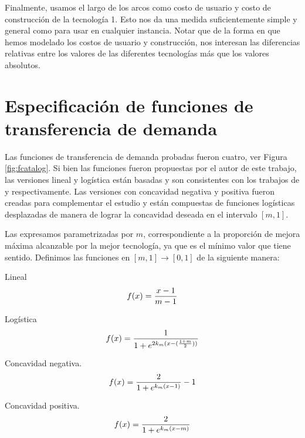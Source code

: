 Finalmente, usamos el largo de los arcos como costo de usuario y costo de construcción de la tecnología 1. Esto nos da una medida suficientemente simple y general como para usar en cualquier instancia. Notar que de la forma en que hemos modelado los costos de usuario y construcción, nos interesan las diferencias relativas entre los valores de las diferentes tecnologías más que los valores absolutos.

\section{Especificación de funciones de transferencia de demanda}
\label{sect:fspecification}

Las funciones de transferencia de demanda probadas fueron cuatro, ver Figura \ref{fig:fcatalog}. Si bien las funciones fueron propuestas por el autor de este trabajo, las versiones lineal y logística están basadas y son consistentes con los trabajos de \textcite{shwe2014} y \textcite{ortuz2011} respectivamente. Las versiones con concavidad negativa y positiva fueron creadas para complementar el estudio y están compuestas de funciones logísticas desplazadas de manera de lograr la concavidad deseada en el intervalo $[m, 1]$.

Las expresamos parametrizadas por $m$, correspondiente a la proporción de mejora máxima alcanzable por la mejor tecnología, ya que es el mínimo valor que tiene sentido. Definimos las funciones en $[m, 1] \rightarrow [0, 1]$ de la siguiente manera:

\begin{definition}
  Lineal
  \begin{align}
      f(x) = {x -1 \over m - 1}
  \end{align}
\end{definition}

\begin{definition}
  Logística
  \begin{align}
      f(x) = {1 \over 1 + e^{2k_m(x - ({1 + m \over 2}))}}
  \end{align}
\end{definition}

\begin{definition}
  Concavidad negativa.
  \begin{align}
      f(x) = {2 \over 1 + e^{k_m(x - 1)}} - 1
  \end{align}
\end{definition}

\begin{definition}
  Concavidad positiva.
  \begin{align}
      f(x) = {2 \over 1 + e^{k_m(x - m)}}
  \end{align}
\end{definition}

